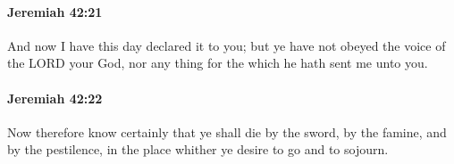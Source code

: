 		\paragraph{Jeremiah 42:21} %
			\label{JEREMIAH-42-21}

			And now I have this day declared it to you; but ye have not obeyed the voice of the LORD your God, nor any thing for the which he hath sent me unto you.


		\paragraph{Jeremiah 42:22} %
			\label{JEREMIAH-42-22}

			Now therefore know certainly that ye shall die by the sword, by the famine, and by the pestilence, in the place whither ye desire to go and to sojourn.

